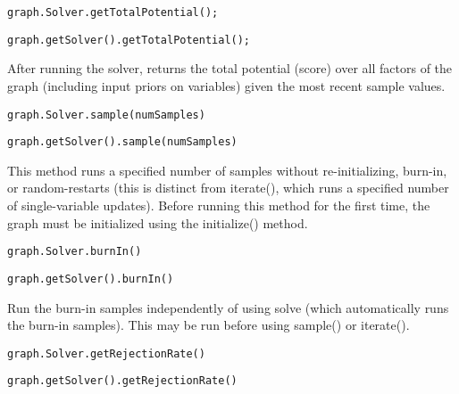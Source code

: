 \ifmatlab
\begin{lstlisting}
graph.Solver.getTotalPotential();
\end{lstlisting}
\fi

\ifjava
\begin{lstlisting}
graph.getSolver().getTotalPotential();
\end{lstlisting}
\fi

After running the solver, returns the total potential (score) over all factors of the graph (including input priors on variables) given the most recent sample values.

\ifmatlab
\begin{lstlisting}
graph.Solver.sample(numSamples)
\end{lstlisting}
\fi

\ifjava
\begin{lstlisting}
graph.getSolver().sample(numSamples)
\end{lstlisting}
\fi

This method runs a specified number of samples without re-initializing, burn-in, or random-restarts (this is distinct from iterate(), which runs a specified number of single-variable updates).  Before running this method for the first time, the graph must be initialized using the initialize() method.

\ifmatlab
\begin{lstlisting}
graph.Solver.burnIn()
\end{lstlisting}
\fi

\ifjava
\begin{lstlisting}
graph.getSolver().burnIn()
\end{lstlisting}
\fi

Run the burn-in samples independently of using solve (which automatically runs the burn-in samples).  This may be run before using sample() or iterate().

\ifmatlab
\begin{lstlisting}
graph.Solver.getRejectionRate()
\end{lstlisting}
\fi

\ifjava
\begin{lstlisting}
graph.getSolver().getRejectionRate()
\end{lstlisting}
\fi


